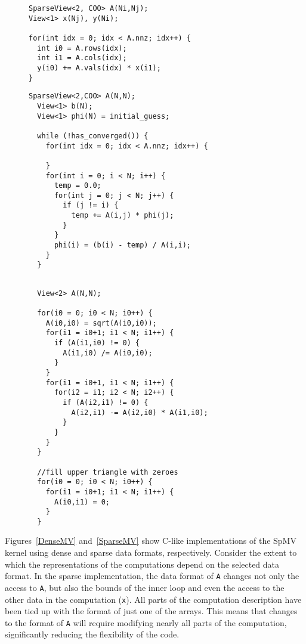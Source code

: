 \begin{figure}
\begin{lstlisting}[caption={C-like implementation of sparse matrix vector multiplication for row-major COO.},label=COOMV]
SparseView<2, COO> A(Ni,Nj);
View<1> x(Nj), y(Ni);

for(int idx = 0; idx < A.nnz; idx++) {
  int i0 = A.rows(idx);
  int i1 = A.cols(idx);
  y(i0) += A.vals(idx) * x(i1);
}
\end{lstlisting}
\end{figure}
\begin{figure}
  \begin{lstlisting}[caption={C-like implementation of sparse Gauss-Seidel iterative solve for row-major COO.},label=DenseGauSei]
  SparseView<2,COO> A(N,N);
  View<1> b(N);
  View<1> phi(N) = initial_guess;
  
  while (!has_converged()) {
    for(int idx = 0; idx < A.nnz; idx++) {

    }
    for(int i = 0; i < N; i++) {
      temp = 0.0;
      for(int j = 0; j < N; j++) {
        if (j != i) {
          temp += A(i,j) * phi(j);
        }
      }
      phi(i) = (b(i) - temp) / A(i,i);
    }
  }
  \end{lstlisting}
  \end{figure}
  \begin{figure}
  \begin{lstlisting}[caption={C-like implementation of sparse incomplete Cholesky factorization for row-major COO.},label=COOInCholFact]
  
  View<2> A(N,N);
  
  for(i0 = 0; i0 < N; i0++) {
    A(i0,i0) = sqrt(A(i0,i0));
    for(i1 = i0+1; i1 < N; i1++) {
      if (A(i1,i0) != 0) {
        A(i1,i0) /= A(i0,i0);
      }
    }
    for(i1 = i0+1, i1 < N; i1++) {
      for(i2 = i1; i2 < N; i2++) {
        if (A(i2,i1) != 0) {
          A(i2,i1) -= A(i2,i0) * A(i1,i0);
        }
      }
    }
  }
  
  //fill upper triangle with zeroes
  for(i0 = 0; i0 < N; i0++) {
    for(i1 = i0+1; i1 < N; i1++) {
      A(i0,i1) = 0;
    }
  }
  \end{lstlisting}
  \end{figure}

Figures~\ref{DenseMV} and~\ref{SparseMV} show C-like implementations of the SpMV kernel using dense and sparse data formats, respectively.
Consider the extent to which the representations of the computations depend on the selected data format.
In the sparse implementation, the data format of \verb.A. changes not only the access to \verb.A., but also the bounds of the inner loop and even the access to the other data in the computation (\verb.x.).
All parts of the computation description have been tied up with the format of just one of the arrays.
This means that changes to the format of \verb.A. will require modifying nearly all parts of the computation, significantly reducing the flexibility of the code. 






